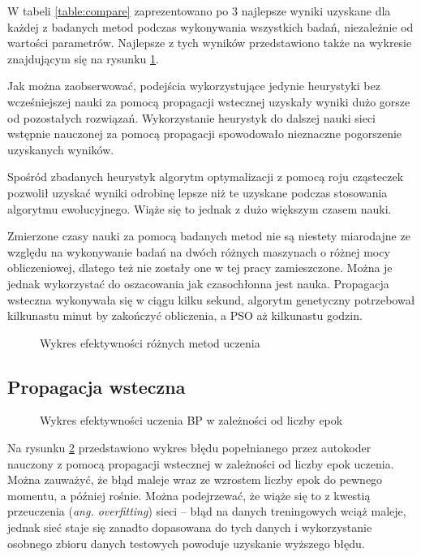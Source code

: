 \documentclass[11pt,a4paper,oneside]{report}
\begin{document}
W tabeli \ref{table:compare} zaprezentowano po 3 najlepsze wyniki uzyskane dla każdej z badanych metod podczas wykonywania wszystkich badań, niezależnie od wartości parametrów. Najlepsze z tych wyników przedstawiono także na wykresie znajdującym się na rysunku \ref{figure:compare}.

Jak można zaobserwować, podejścia wykorzystujące jedynie heurystyki bez wcześniejszej nauki za pomocą propagacji wstecznej uzyskały wyniki dużo gorsze od pozostałych rozwiązań. Wykorzystanie heurystyk do dalszej nauki sieci wstępnie nauczonej za pomocą propagacji spowodowało nieznaczne pogorszenie uzyskanych wyników.

Spośród zbadanych heurystyk algorytm optymalizacji z pomocą roju cząsteczek pozwolił uzyskać wyniki odrobinę lepsze niż te uzyskane podczas stosowania algorytmu ewolucyjnego. Wiąże się to jednak z dużo większym czasem nauki. 

Zmierzone czasy nauki za pomocą badanych metod nie są niestety miarodajne ze względu na wykonywanie badań na dwóch różnych maszynach o różnej mocy obliczeniowej, dlatego też nie zostały one w tej pracy zamieszczone. Można je jednak wykorzystać do oszacowania jak czasochłonna jest nauka. Propagacja wsteczna wykonywała się w ciągu kilku sekund, algorytm genetyczny potrzebował kilkunastu minut by zakończyć obliczenia, a PSO aż kilkunastu godzin.

\begin{figure}[H]
	\caption{Wykres efektywności różnych metod uczenia \label{figure:compare}}
	
\end{figure}

\subsection{Propagacja wsteczna}

\begin{figure}[H]
	\caption{Wykres efektywności uczenia BP w zależności od liczby epok \label{figure:bp_epochs}}
	
\end{figure}

Na rysunku \ref{figure:bp_epochs} przedstawiono wykres błędu popełnianego przez autokoder nauczony z pomocą propagacji wstecznej w zależności od liczby epok uczenia. Można zauważyć, że błąd maleje wraz ze wzrostem liczby epok do pewnego momentu, a później rośnie. Można podejrzewać, że wiąże się to z kwestią przeuczenia (\textit{ang. overfitting}) sieci -- błąd na danych treningowych wciąż maleje, jednak sieć staje się zanadto dopasowana do tych danych i wykorzystanie osobnego zbioru danych testowych powoduje uzyskanie wyższego błędu.
\end{document}
